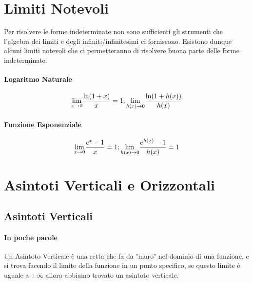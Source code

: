 \documentclass[12pt, a4paper, openany]{book}
\begin{document}
\section{Limiti Notevoli}
Per risolvere le forme indeterminate non sono sufficienti gli strumenti che l'algebra dei limiti e degli infiniti/infinitesimi ci forniscono.
Esistono dunque alcuni limiti notevoli che ci permetteranno di risolvere buona parte delle forme indeterminate.

\paragraph*{Logaritmo Naturale}
$$\underset{x \to 0}{\lim} \frac{\ln(1+x)}{x} = 1 ; \underset{h(x) \to 0}{\lim} \frac{\ln(1+h(x))}{h(x)}$$ 

\paragraph*{Funzione Esponenziale}
$$\underset{x \to 0}{\lim} \frac{e^x-1}{x} = 1; \underset{h(x) \to 0}{\lim} \frac{e^{h(x)}-1}{h(x)} = 1$$





\section{Asintoti Verticali e Orizzontali}
\subsection*{Asintoti Verticali}
\paragraph*{In poche parole} Un Asintoto Verticale è una retta che fa da "muro" nel dominio di una funzione, e si trova facendo il limite della funzione in un punto specifico, se questo limite è uguale a $\pm \infty$ allora abbiamo trovato un asintoto verticale.
\end{document}
